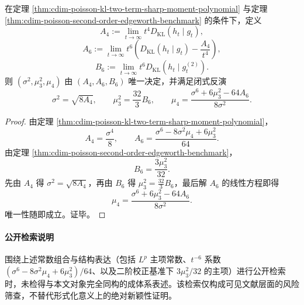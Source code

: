 \begin{theorem}\label{thm:cdim-poisson-entropy-moment-tomography-up-to-fourth}
在定理 \ref{thm:cdim-poisson-kl-two-term-sharp-moment-polynomial} 与定理 \ref{thm:cdim-poisson-second-order-edgeworth-benchmark} 的条件下，定义
\[
A_4:=\lim_{t\to\infty}t^4D_{\mathrm{KL}}(h_t\mid g_t),
\]
\[
A_6:=\lim_{t\to\infty}t^6\!\left(D_{\mathrm{KL}}(h_t\mid g_t)-\frac{A_4}{t^4}\right),
\]
\[
B_6:=\lim_{t\to\infty}t^6D_{\mathrm{KL}}(h_t\mid g_t^{(2)}).
\]
则 \((\sigma^2,\mu_3^2,\mu_4)\) 由 \((A_4,A_6,B_6)\) 唯一决定，并满足闭式反演
\[
\sigma^2=\sqrt{8A_4},
\qquad
\mu_3^2=\frac{32}{3}B_6,
\qquad
\mu_4=\frac{\sigma^6+6\mu_3^2-64A_6}{8\sigma^2}.
\]
\end{theorem}
\begin{proof}
由定理 \ref{thm:cdim-poisson-kl-two-term-sharp-moment-polynomial}，
\[
A_4=\frac{\sigma^4}{8},
\qquad
A_6=\frac{\sigma^6-8\sigma^2\mu_4+6\mu_3^2}{64}.
\]
由定理 \ref{thm:cdim-poisson-second-order-edgeworth-benchmark}，
\[
B_6=\frac{3\mu_3^2}{32}.
\]
先由 \(A_4\) 得 \(\sigma^2=\sqrt{8A_4}\)，再由 \(B_6\) 得 \(\mu_3^2=\frac{32}{3}B_6\)，最后解 \(A_6\) 的线性方程即得
\[
\mu_4=\frac{\sigma^6+6\mu_3^2-64A_6}{8\sigma^2}.
\]
唯一性随即成立。证毕。
\end{proof}

\paragraph{公开检索说明}
围绕上述常数组合与结构表达（包括 \(L^p\) 主项常数、\(t^{-6}\) 系数 \((\sigma^6-8\sigma^2\mu_4+6\mu_3^2)/64\)、以及二阶校正基准下 \(3\mu_3^2/32\) 的主项）进行公开检索时，未检得与本文对象完全同构的成体系表述。该检索仅构成可见文献层面的风险筛查，不替代形式化意义上的绝对新颖性证明。

\endinput
